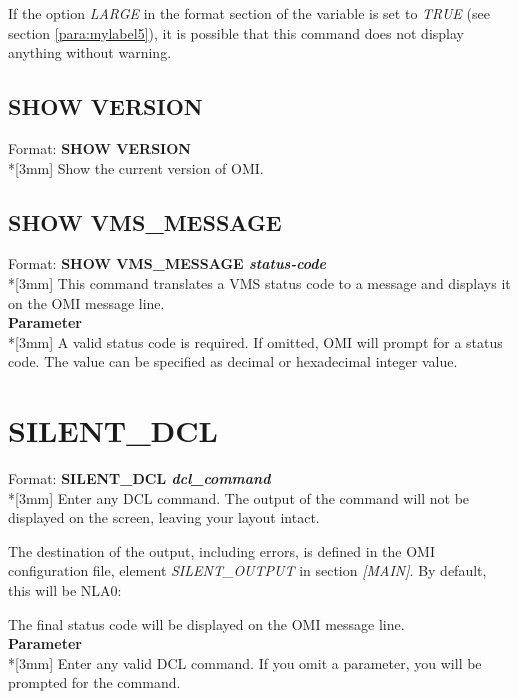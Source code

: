 \documentclass[a4paper]{book}
\newcommand{\vs}{\vspace{3mm}}
\renewcommand{\indent}{\hspace*{5mm}}
\begin{document}
\vs

If the option \textsl{LARGE} in the format section of the variable is set to \textsl{TRUE} 
(see section \ref{para:mylabel5}), it is possible that this 
command does not display anything without warning.

\subsection{SHOW VERSION}
\label{subsubsec:mylabel84}

\indent Format: \textbf{SHOW VERSION}\\*[3mm]
Show the current version of OMI.

\subsection{SHOW VMS{\_}MESSAGE}
\label{subsubsec:mylabel85}

\indent Format: \textbf{SHOW VMS{\_}MESSAGE \textit{status-code}}\\*[3mm]
This command translates a VMS status code to a message and displays it on the 
OMI message line.\\[3mm]
\textbf{Parameter}\\*[3mm]
A valid status code is required. If omitted, OMI will prompt for a status 
code. The value can be specified as decimal or hexadecimal integer value.

\section{SILENT{\_}DCL}
\label{subsec:silent}

\indent Format: \textbf{SILENT{\_}DCL \textit{dcl{\_}command}}\\*[3mm]
Enter any DCL command. The output of the command will not be displayed on 
the screen, leaving your layout intact.

The destination of the output, including errors, is defined in the OMI 
configuration file, element \textsl{SILENT{\_}OUTPUT} in section \textsl{[MAIN]}. By default, 
this will be NLA0:

The final status code will be displayed on the OMI message line.\\[3mm]
\textbf{Parameter}\\*[3mm]
Enter any valid DCL command. If you omit a parameter, you will be prompted 
for the command.
\end{document}
